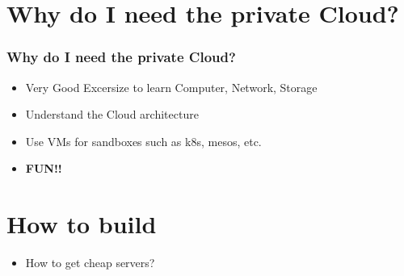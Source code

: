 \documentclass[aspectratio=169,11pt,hyperref={colorlinks=true}]{beamer}
\begin{document}
\section{Why do I need the private Cloud?}
\begin{frame}
  \frametitle{Why do I need the private Cloud?}
  \begin{itemize}
    \item Very Good Excersize to learn Computer, Network, Storage
    \item Understand the Cloud architecture
    \item Use VMs for sandboxes such as k8s, mesos, etc.
    \item \bf{FUN!!}
  \end{itemize}
\end{frame}

\section{How to build}
\begin{frame}
  \begin{itemize}
  \item[] How to get cheap servers?
  \end{itemize}
\end{frame}
\end{document}
